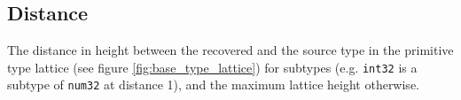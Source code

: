 
\subsection{Distance}

The distance in height between the recovered and the source type in the primitive type lattice (see figure \ref{fig:base_type_lattice}) for subtypes (e.g. \texttt{int32} is a subtype of \texttt{num32} at distance 1), and the maximum lattice height otherwise.

